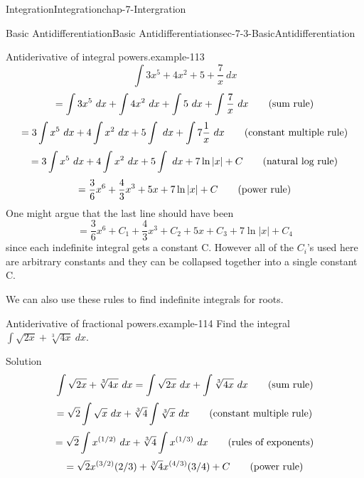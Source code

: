 \documentclass[oneside,10pt,]{book}
\numberwithin{equation}{section}
\begin{document}
\begin{chapterptx}{Integration}{}{Integration}{}{}{chap-7-Intergration}
\begin{sectionptx}{Basic Antidifferentiation}{}{Basic Antidifferentiation}{}{}{sec-7-3-BasicAntidifferentiation}
\begin{example}{Antiderivative of integral powers.}{example-113}
\begin{equation*}
\int 3x^5+4x^2+5+\frac{7}{x}\ dx
\end{equation*}
%
\begin{equation*}
=\int 3x^5\ dx+\int 4x^2\ dx+\int 5\ dx+\int \frac{7}{x}\ dx\qquad\hbox{(sum rule)}
\end{equation*}
%
\begin{equation*}
=3\int x^5\ dx+4\int x^2\ dx+5\int \ dx+\int 7\frac{1}{x}\ dx\qquad\hbox{(constant multiple rule)}
\end{equation*}
%
\begin{equation*}
=3\int x^5\ dx+4\int x^2\ dx+5\int \ dx+ 7\ln|x|+C\qquad\hbox{(natural log rule)}
\end{equation*}
%
\begin{equation*}
=\frac{3}{6} x^6+\frac{4}{3}x^3+5x+ 7\ln|x|+C\qquad\hbox{(power rule)}
\end{equation*}
\hypertarget{p-2746}{}%
One might argue that the last line should have been%
%
\begin{equation*}
=\frac{3}{6} x^6+C_1+\frac{4}{3}x^3+C_2+5x+C_3+ 7\ln|x|+C_4
\end{equation*}
\hypertarget{p-2747}{}%
since each indefinite integral gets a constant C.  However all of the \(C_i\)’s used here are arbitrary constants and they can be collapsed together into a single constant C.%
\end{example}
\hypertarget{p-2748}{}%
We can also use these rules to find indefinite integrals for roots.%
\begin{example}{Antiderivative of fractional powers.}{example-114}%
\hypertarget{p-2749}{}%
Find the integral \(\int \sqrt{2x}+\sqrt[3]{4x}\ dx\).%
\par
\hypertarget{p-2750}{}%
Solution%
%
\begin{equation*}
\int \sqrt{2x}+\sqrt[3]{4x}\ dx
=\int \sqrt{2x}\ dx+\int \sqrt[3]{4x}\ dx\qquad\hbox{(sum rule)}
\end{equation*}
%
\begin{equation*}
=\sqrt{2}\int \sqrt{x}\ dx+\sqrt[3]{4}\int \sqrt[3]{x}\ dx \qquad\hbox{(constant multiple rule)}
\end{equation*}
%
\begin{equation*}
=\sqrt{2}\int x^{(1/2)}\ dx+\sqrt[3]{4}\int x^{(1/3)}\ dx\qquad\hbox{(rules of exponents)}
\end{equation*}
%
\begin{equation*}
=\sqrt{2} x^{(3/2)}(2/3)+\sqrt[3]{4}x^{(4/3)}(3/4)+C\qquad\hbox{(power rule)}
\end{equation*}
\end{example}

\end{sectionptx}
\end{chapterptx}
\end{document}
